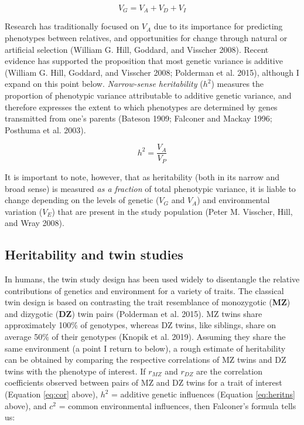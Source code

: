 \documentclass[
]{book}
\begin{document}
\begin{equation}
V_G = V_A + V_D + V_I \label{eq:gendecomp}
\end{equation}

Research has traditionally focused on \(V_A\) due to its importance for predicting phenotypes between relatives, and opportunities for change through natural or artificial selection (William G. Hill, Goddard, and Visscher 2008). Recent evidence has supported the proposition that most genetic variance is additive (William G. Hill, Goddard, and Visscher 2008; Polderman et al. 2015), although I expand on this point below. \emph{Narrow-sense heritability} (\(h^2\)) measures the proportion of phenotypic variance attributable to additive genetic variance, and therefore expresses the extent to which phenotypes are determined by genes transmitted from one's parents (Bateson 1909; Falconer and Mackay 1996; Posthuma et al. 2003).

\begin{equation}
h^2 = \frac{V_A}{V_P} \label{eq:heritns}
\end{equation}

It is important to note, however, that as heritability (both in its narrow and broad sense) is measured \emph{as a fraction} of total phenotypic variance, it is liable to change depending on the levels of genetic (\(V_G\) and \(V_A\)) and environmental variation (\(V_E\)) that are present in the study population (Peter M. Visscher, Hill, and Wray 2008).

\hypertarget{heritability-and-twin-studies}{%
\subsection{Heritability and twin studies}\label{heritability-and-twin-studies}}

In humans, the twin study design has been used widely to disentangle the relative contributions of genetics and environment for a variety of traits. The classical twin design is based on contrasting the trait resemblance of monozygotic (\textbf{MZ}) and dizygotic (\textbf{DZ}) twin pairs (Polderman et al. 2015). MZ twins share approximately 100\% of genotypes, whereas DZ twins, like siblings, share on average 50\% of their genotypes (Knopik et al. 2019). Assuming they share the same environment (a point I return to below), a rough estimate of heritability can be obtained by comparing the respective correlations of MZ twins and DZ twins with the phenotype of interest. If \(r_{MZ}\) and \(r_{DZ}\) are the correlation coefficients observed between pairs of MZ and DZ twins for a trait of interest (Equation \eqref{eq:cor} above), \(h^2\) = additive genetic influences (Equation \eqref{eq:heritns} above), and \(c^2\) = common environmental influences, then Falconer's formula tells us:
\end{document}

